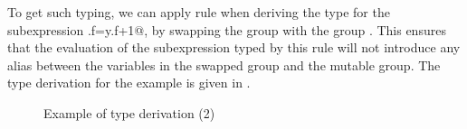 {To {get} such typing, we can apply rule  when deriving the type for the subexpression \Q@y.f=y.f+1@, by swapping the group \Q@y@ with the group \Q@x@. 
This ensures that the evaluation of the subexpression typed by this rule will not introduce any alias between the
variables in the swapped group and the mutable group. {The type derivation for the example is given in .}
 \begin{figure}[t]
\caption{Example of type derivation (2)}\label{fig:TypingTwo}
\end{figure}

}
